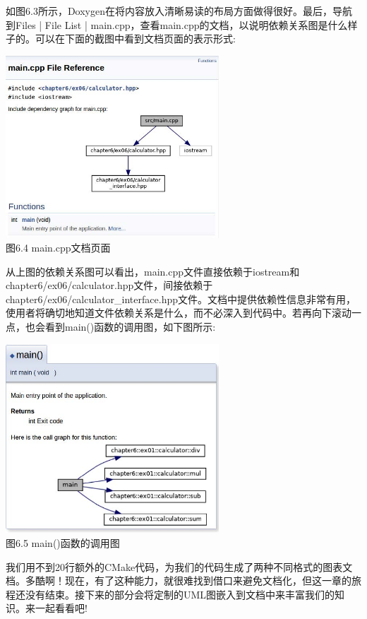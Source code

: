 如图6.3所示，Doxygen在将内容放入清晰易读的布局方面做得很好。最后，导航到Files | File List | main.cpp，查看main.cpp的文档，以说明依赖关系图是什么样子的。可以在下面的截图中看到文档页面的表示形式:

\begin{center}
\includegraphics[width=0.6\textwidth]{content/2/chapter6/images/4.jpg}\\
图6.4  main.cpp文档页面
\end{center}

从上图的依赖关系图可以看出，main.cpp文件直接依赖于iostream和chapter6/ex06/calculator.hpp文件，间接依赖于chapter6/ex06/calculator\_interface.hpp文件。文档中提供依赖性信息非常有用，使用者将确切地知道文件依赖关系是什么，而不必深入到代码中。若再向下滚动一点，也会看到main()函数的调用图，如下图所示:

\begin{center}
\includegraphics[width=0.6\textwidth]{content/2/chapter6/images/5.jpg}\\
图6.5  main()函数的调用图
\end{center}

我们用不到20行额外的CMake代码，为我们的代码生成了两种不同格式的图表文档。多酷啊！现在，有了这种能力，就很难找到借口来避免文档化，但这一章的旅程还没有结束。接下来的部分会将定制的UML图嵌入到文档中来丰富我们的知识。来一起看看吧!
 

